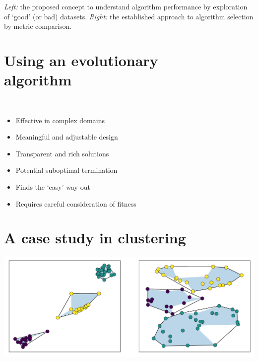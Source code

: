 \documentclass{betterposter}
\begin{document}
{\textcolor{mygrey}{%
    \textit{Left:} the proposed concept to understand algorithm performance by
    exploration of `good' (or bad) datasets. \textit{Right:} the established
    approach to algorithm selection by metric comparison.
}

\vspace{-.5em}\section{Using an evolutionary\\algorithm}

\vspace{-1em}\begin{minipage}{.04\linewidth}
    \
\end{minipage}
\begin{minipage}{.9\linewidth}
    \begin{itemize}
        \renewcommand\labelitemi{\faThumbsOUp~}
        \item Effective in complex domains
        \item Meaningful and adjustable design
        \item Transparent and rich solutions
    \end{itemize}

    \vspace{1ex}\begin{itemize}
        \renewcommand\labelitemi{\faThumbsODown~}
        \item Potential suboptimal termination
        \item Finds the `easy' way out
        \item Requires careful consideration of fitness
    \end{itemize}
\end{minipage}


\section{A case study in clustering}

\vspace{-1.5em}\begin{center}
    \begin{minipage}{.8\linewidth}
        \includegraphics[width=\linewidth]{img/kmeans.pdf}\vspace{1ex}


\end{minipage}
\end{center}}
\end{document}
